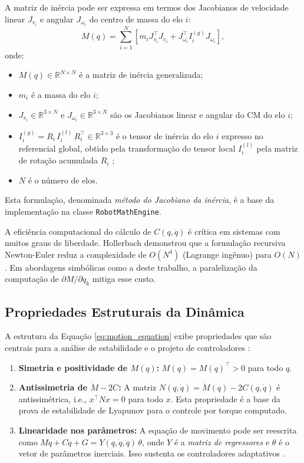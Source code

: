 A matriz de inércia pode ser expressa em termos dos Jacobianos de velocidade linear $J_{v_i}$ e angular $J_{\omega_i}$ do centro de massa do elo $i$:
\begin{equation}
    M(q) = \sum_{i=1}^{N} \left[ m_i J_{v_i}^\top J_{v_i} + J_{\omega_i}^\top I_i^{(g)} J_{\omega_i} \right],
    \label{eq:inertia_matrix}
\end{equation}
onde:
\begin{itemize}
    \item $M(q) \in \mathbb{R}^{N\times N}$ é a matriz de inércia generalizada;
    \item $m_i$ é a massa do elo $i$;
    \item $J_{v_i} \in \mathbb{R}^{3\times N}$ e $J_{\omega_i} \in \mathbb{R}^{3\times N}$ são os Jacobianos linear e angular do CM do elo $i$;
    \item $I_i^{(g)} = R_i\, I_i^{(l)}\, R_i^\top \in \mathbb{R}^{3\times 3}$ é o tensor de inércia do elo $i$ expresso no referencial global, obtido pela transformação do tensor local $I_i^{(l)}$ pela matriz de rotação acumulada $R_i$ \cite{siciliano2009robotics};
    \item $N$ é o número de elos.
\end{itemize} Esta formulação, denominada \textit{método do Jacobiano da inércia}, é a base da implementação na classe \texttt{RobotMathEngine}.

A eficiência computacional do cálculo de $C(q,\dot{q})$ é crítica em sistemas com muitos graus de liberdade. Hollerbach \cite{hollerbach1980recursive} demonstrou que a formulação recursiva Newton-Euler reduz a complexidade de $O(N^4)$ (Lagrange ingênuo) para $O(N)$. Em abordagens simbólicas como a deste trabalho, a paralelização da computação de $\partial M/\partial q_k$ mitiga esse custo.

\subsection{Propriedades Estruturais da Dinâmica}

A estrutura da Equação \eqref{eq:motion_equation} exibe propriedades que são centrais para a análise de estabilidade e o projeto de controladores \cite{slotine1991applied, spong2020robot}:

\begin{enumerate}
    \item \textbf{Simetria e positividade de $M(q)$:} $M(q) = M(q)^\top > 0$ para todo $q$.
    \item \textbf{Antissimetria de $\dot{M} - 2C$:} A matriz $N(q,\dot{q}) = \dot{M}(q) - 2C(q,\dot{q})$ é antissimétrica, i.e., $x^\top N x = 0$ para todo $x$. Esta propriedade é a base da prova de estabilidade de Lyapunov para o controle por torque computado.
    \item \textbf{Linearidade nos parâmetros:} A equação de movimento pode ser reescrita como $M\ddot{q} + C\dot{q} + G = Y(q,\dot{q},\ddot{q})\,\theta$, onde $Y$ é a \textit{matriz de regressores} e $\theta$ é o vetor de parâmetros inerciais. Isso sustenta os controladores adaptativos \cite{slotine1987adaptive}.
\end{enumerate}

